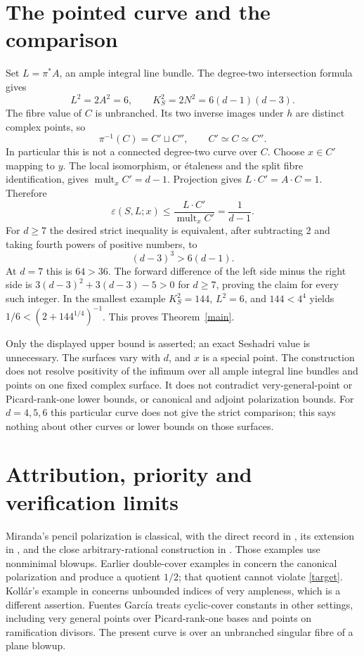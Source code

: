 \documentclass[11pt]{article}
\newcommand{\eps}{\varepsilon}
\begin{document}
\section{The pointed curve and the comparison}
Set $L=\pi^*A$, an ample integral line bundle. The degree-two intersection
formula gives
\[
 L^2=2A^2=6,\qquad K_S^2=2N^2=6(d-1)(d-3).
\]
The fibre value of $C$ is unbranched. Its two inverse images under $h$ are
distinct complex points, so
\[
 \pi^{-1}(C)=C'\sqcup C'',\qquad C'\simeq C\simeq C''.
\]
In particular this is not a connected degree-two curve over $C$. Choose
$x\in C'$ mapping to $y$. The local isomorphism, or \'etaleness and the
split fibre identification, gives $\operatorname{mult}_x C'=d-1$.
Projection gives $L\cdot C'=A\cdot C=1$. Therefore
\[
 \eps(S,L;x)\le\frac{L\cdot C'}{\operatorname{mult}_x C'}=\frac1{d-1}.
\]
For $d\ge7$ the desired strict inequality is equivalent, after subtracting
$2$ and taking fourth powers of positive numbers, to
\[
 (d-3)^3>6(d-1).
\]
At $d=7$ this is $64>36$. The forward difference of the left side minus
the right side is $3(d-3)^2+3(d-3)-5>0$ for $d\ge7$, proving the claim
for every such integer. In the smallest example $K_S^2=144$, $L^2=6$,
and $144<4^4$ yields $1/6<(2+144^{1/4})^{-1}$. This proves
Theorem~\ref{main}.

Only the displayed upper bound is asserted; an exact Seshadri value is
unnecessary. The surfaces vary with $d$, and $x$ is a special point.
The construction does not resolve positivity of the infimum over all ample
integral line bundles and points on one fixed complex surface. It does not
contradict very-general-point or Picard-rank-one lower bounds, or canonical
and adjoint polarization bounds. For $d=4,5,6$ this particular curve does
not give the strict comparison; this says nothing about other curves or
lower bounds on those surfaces.

\section{Attribution, priority and verification limits}\label{limits}
Miranda's pencil polarization is classical, with the direct record in
\cite{EL}, its extension in \cite{Bauer}, and the close arbitrary-rational
construction in \cite{Adjoint}. Those examples use nonminimal blowups.
Earlier double-cover examples in \cite[Example~1.3]{Canonical} concern the
canonical polarization and produce a quotient $1/2$; that quotient cannot
violate \eqref{target}. Koll\'ar's example in \cite[Example~3.7]{EL}
concerns unbounded indices of very ampleness, which is a different assertion.
Fuentes Garc\'ia \cite{Fuentes} treats cyclic-cover constants in other
settings, including very general points over Picard-rank-one bases and
points on ramification divisors. The present curve is over an unbranched
singular fibre of a plane blowup.
\end{document}
